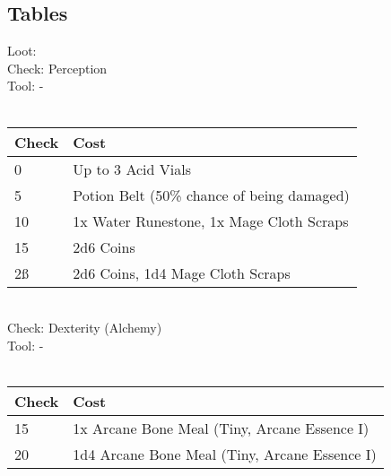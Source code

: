 \subsection{Tables}
Loot:\\
Check: Perception\\
Tool: -\\
\\
\begin{minipage}{0.8\textwidth}
    \begin{tabular}{|l | l|}
        \hline
        Check & Cost\\
        \hline
        0 & Up to 3 Acid Vials\\
        5 & Potion Belt (50\% chance of being damaged)\\
        10 & 1x Water Runestone, 1x Mage Cloth Scraps\\
        15 & 2d6 Coins\\
        2ß & 2d6 Coins, 1d4 Mage Cloth Scraps\\
        \hline
    \end{tabular}
\end{minipage}
\\
Check: Dexterity (Alchemy)\\
Tool: -\\
\\
\begin{minipage}{0.8\textwidth}
    \begin{tabular}{|l | l|}
        \hline
        Check & Cost\\
        \hline
        15 & 1x Arcane Bone Meal (Tiny, Arcane Essence I)\\
        20 & 1d4 Arcane Bone Meal (Tiny, Arcane Essence I)\\
        \hline
    \end{tabular}
\end{minipage}
\pagebreak